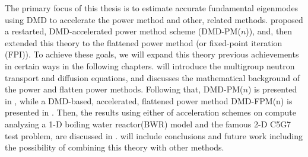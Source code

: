The primary focus of this thesis is to estimate accurate fundamental eigenmodes using DMD to accelerate the power method and other, related methods.
\citet{roberts2019acceleration} proposed a restarted, DMD-accelerated power method scheme (DMD-PM($n$)), and, \citet{xu_acceleration} then extended this theory to the flattened power method (or fixed-point iteration (FPI)).
To achieve these goals, we will expand this theory previous achievements in certain ways in the following chapters.
 will introduce the multigroup neutron transport and diffusion equations, and  discusses the mathematical background of the power and flatten power methods.
Following that, DMD-PM($n$) is presented in , while a DMD-based, accelerated, flattened power
method DMD-FPM(n) is presented in .
Then, the results using either of acceleration schemes on compute analyzing a 1-D boiling water reactor(BWR) model and the famous 2-D C5G7 test problem, are discussed in .
 will include conclusions and future work including the possibility of combining this theory with other methods. 

